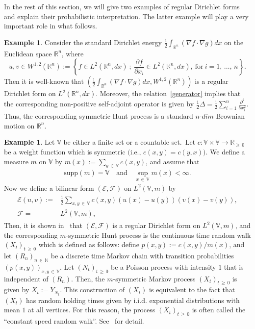\documentclass[10pt]{amsart}
\theoremstyle{definition}\newtheorem{defi}[theo]{Definition}\newtheorem{rema}[theo]{Remark}\newtheorem{exam}[theo]{Example}\newtheorem{exem}[theo]{Example}\newtheorem{nota}[theo]{Notation}
\newcommand{\ce}{\mathcal{E}}
\newcommand{\cf}{\mathcal{F}}
\newcommand{\br}{\mathbb{R}}
\newcommand{\bn}{\mathbb{N}}
\newcommand{\bv}{\mathbb{V}}
\newcommand{\supp}{\mathrm{supp}}
\begin{document}
In the rest of this section, we will give two examples of regular Dirichlet forms and explain their probabilistic interpretation. The latter example will play a very important role in what follows.
\begin{exem}
Consider the standard Dirichlet energy $\frac{1}{2}\int_{\br^n}(\nabla f\cdot\nabla g)dx$ on the Euclidean space $\br^n$, where 
\[
u,v\in W^{1,2}\left(\br^n\right):=\left\{f\in L^2\left(\br^n,dx\right)\ ;\
\frac{\partial f}{\partial x_i}\in L^2\left(\br^n,dx\right),\ \text{for}\ i=1,\,\dots,\,n\right\}.
\]
Then it is well-known that $(\frac{1}{2}\int_{\br^n}(\nabla f\cdot\nabla g)dx,W^{1,2}(\br^n))$ is a regular Dirichlet form on $L^2(\br^n,dx)$. Moreover, the relation~\eqref{generator} implies that the corresponding non-positive self-adjoint operator is given by $\frac{1}{2}\Delta=\frac{1}{2}\sum_{i=1}^n\frac{\partial^2}{\partial x_i^2}$. Thus, the corresponding symmetric Hunt process is a standard $n$-$dim$ Brownian motion on $\br^n$.
\end{exem}

\begin{exem}\label{csrw}
Let $\bv$ be either a finite set or a countable set.\ Let $c:\bv\times\bv\to\br_{\geq\,0}$ be a weight function which is symmetric $($i.e., $c(x,y)=c(y,x))$. We define a measure $m$ on $\bv$ by $m(x):=\sum_{y\,\in\,\bv}c(x,y)$, and assume that
\begin{align}\label{assume-m}
\supp(m)=\bv\quad \text{and}\quad \sup_{x\,\in\,\bv}m(x)<\infty.
\end{align}
Now we define a bilinear form $(\ce,\cf)$ on $L^2(\bv,m)$ by
\begin{align}\label{srw}
\begin{split}
\ce(u,v){:=}&\frac{1}{2}\sum_{x,y\,\in\,\bv}c(x,y)(u(x)-u(y))(v(x)-v(y)), \\
\cf=& L^2(\bv,m),
\end{split}
\end{align}
Then, it is shown in~\cite[Theorem~2.2.2]{CF} that $(\ce,\cf)$ is a regular Dirichlet form on $L^2(\bv,m)$, and the corresponding $m$-symmetric Hunt process is the continuous time random walk $(X_t)_{t\,\geq\,0}$ which is defined as follows: define $p(x,y):=c(x,y)/m(x)$, and let $(R_n)_{n\,\in\,\bn}$ be a discrete time Markov chain with transition probabilities $(p(x,y))_{x,y\,\in\,\bv}$. Let $(N_t)_{t\,\geq\,0}$ be a Poisson process with intensity 1 that is independent of $(R_n)$. Then, the $m$-symmetric Markov process $(X_t)_{t\,\geq\,0}$ is given by $X_t:=Y_{N_t}$. This construction of $(X_t)$ is equivalent to the fact that $(X_t)$ has random holding times given by i.i.d. exponential distributions with mean $1$ at all vertices. For this reason, the process $(X_t)_{t\,\geq\,0}$ is often called the ``constant speed random walk''. See~\cite[Section~2.2.1]{CF} for detail.
\end{exem}
\end{document}

